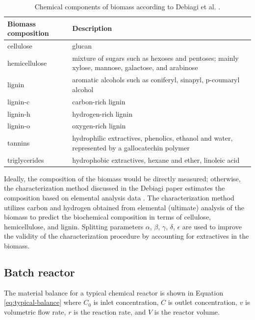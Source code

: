 \begin{table}[H]
    \centering
    \caption{Chemical components of biomass according to Debiagi et al. \cite{Debiagi-2015}.}
    \label{tab:chem-components}
    \begin{tabular}{lp{2.2in}}
        \toprule
        Biomass composition & Description \\
        \midrule
        cellulose     & glucan \\
        \addlinespace[0.1in]
        hemicellulose & mixture of sugars such as hexoses and pentoses; mainly xylose, mannose, galactose, and arabinose \\
        \addlinespace[0.1in]
        lignin        & aromatic alcohols such as coniferyl, sinapyl, p-coumaryl alcohol \\
        \addlinespace[0.1in]
        lignin-c      & carbon-rich lignin \\
        \addlinespace[0.1in]
        lignin-h      & hydrogen-rich lignin \\
        \addlinespace[0.1in]
        lignin-o      & oxygen-rich lignin \\
        \addlinespace[0.1in]
        tannins       & hydrophilic extractives, phenolics, ethanol and water, represented by a gallocatechin polymer \\
        \addlinespace[0.1in]
        triglycerides & hydrophobic extractives, hexane and ether, linoleic acid \\
        \bottomrule
    \end{tabular}
\end{table}

Ideally, the composition of the biomass would be directly measured; otherwise, the characterization method discussed in the Debiagi paper estimates the composition based on elemental analysis data \cite{Debiagi-2015}. The characterization method utilizes carbon and hydrogen obtained from elemental (ultimate) analysis of the biomass to predict the biochemical composition in terms of cellulose, hemicellulose, and lignin. Splitting parameters $\alpha$, $\beta$, $\gamma$, $\delta$, $\epsilon$ are used to improve the validity of the characterization procedure by accounting for extractives in the biomass.

\subsection{Batch reactor}

The material balance for a typical chemical reactor is shown in Equation \ref{eq:typical-balance} where $C_0$ is inlet concentration, $C$ is outlet concentration, $v$ is volumetric flow rate, $r$ is the reaction rate, and $V$ is the reactor volume.

